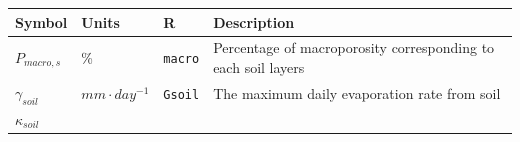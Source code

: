 \documentclass[]{book}
\begin{document}
\begin{longtable}[]{@{}llll@{}}
\toprule
\begin{minipage}[b]{0.11\columnwidth}\raggedright\strut
Symbol\strut
\end{minipage} & \begin{minipage}[b]{0.10\columnwidth}\raggedright\strut
Units\strut
\end{minipage} & \begin{minipage}[b]{0.06\columnwidth}\raggedright\strut
R\strut
\end{minipage} & \begin{minipage}[b]{0.53\columnwidth}\raggedright\strut
Description\strut
\end{minipage}\tabularnewline
\midrule
\endhead
\begin{minipage}[t]{0.11\columnwidth}\raggedright\strut
\(P_{macro, s}\)\strut
\end{minipage} & \begin{minipage}[t]{0.10\columnwidth}\raggedright\strut
\%\strut
\end{minipage} & \begin{minipage}[t]{0.06\columnwidth}\raggedright\strut
\texttt{macro}\strut
\end{minipage} & \begin{minipage}[t]{0.53\columnwidth}\raggedright\strut
Percentage of macroporosity corresponding to each soil layers\strut
\end{minipage}\tabularnewline
\begin{minipage}[t]{0.11\columnwidth}\raggedright\strut
\(\gamma_{soil}\)\strut
\end{minipage} & \begin{minipage}[t]{0.10\columnwidth}\raggedright\strut
\(mm \cdot day^{-1}\)\strut
\end{minipage} & \begin{minipage}[t]{0.06\columnwidth}\raggedright\strut
\texttt{Gsoil}\strut
\end{minipage} & \begin{minipage}[t]{0.53\columnwidth}\raggedright\strut
The maximum daily evaporation rate from soil\strut
\end{minipage}\tabularnewline
\begin{minipage}[t]{0.11\columnwidth}\raggedright\strut
\(\kappa_{soil}\)\strut
\end{minipage} & \begin{minipage}[t]{0.10\columnwidth}\raggedright\strut
\strut
\end{minipage} & \begin{minipage}[t]{0.06\columnwidth}\raggedright\strut

\end{minipage}
\end{longtable}
\end{document}
